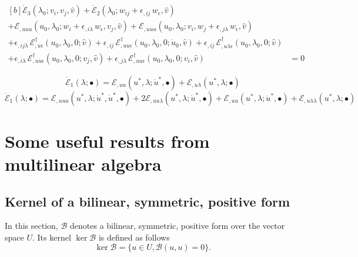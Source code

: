 \documentclass[12pt, final]{scrartcl}
\theoremstyle{definition}
\newcommand{\E}{\mathcal E}
\newcommand{\EE}{\mathcal E ^ \dagger}
\begin{document}
\begin{equation}
  \begin{aligned}[b]
    \dot{\E}_3(\lambda_0; v_i, v_j, \hat{v}) + \dot{\E}_2(\lambda_0; w_{ij} + \epsilon_{,ij} \, w_\epsilon, \hat{v}) &\\
    + \E_{,uuu}(u_0, \lambda_0; w_i + \epsilon_{,i\lambda} \,  w_\epsilon, v_j, \hat{v}) + \E_{,uuu}(u_0, \lambda_0; v_i, w_j + \epsilon_{,j\lambda} \,  w_\epsilon, \hat{v}) &\\
    + \epsilon_{,ij\lambda} \, \EE_{,u\epsilon}(u_0, \lambda_0, 0; \hat{v}) + \epsilon_{,ij} \, \EE_{,uu\epsilon}(u_0, \lambda_0, 0; \dot{u}_0, \hat{v}) + \epsilon_{,ij} \, \EE_{,u\lambda\epsilon}(u_0, \lambda_0, 0; \hat{v}) &\\
    + \epsilon_{,i\lambda} \, \EE_{,uu\epsilon}(u_0, \lambda_0, 0; v_j, \hat{v}) + \epsilon_{,j\lambda} \, \EE_{,uu\epsilon}(u_0, \lambda_0, 0; v_i, \hat{v}) &= 0
  \end{aligned}
\end{equation}


\begin{equation*}
  \dot{\E}_1(\lambda; \bullet) = \E_{,uu}(u^\ast, \lambda; \dot{u}^\ast, \bullet) + \E_{,u\lambda}(u^\ast, \lambda; \bullet)
\end{equation*}
\begin{equation*}
  \ddot{\E}_1(\lambda; \bullet) = \E_{,uuu}(u^\ast, \lambda; \dot{u}^\ast, \dot{u}^\ast, \bullet) + 2\E_{,uu\lambda}(u^\ast, \lambda; \dot{u}^\ast, \bullet) + \E_{,uu}(u^\ast, \lambda; \ddot{u}^\ast, \bullet) + \E_{,u\lambda\lambda}(u^\ast, \lambda; \bullet)
\end{equation*}

\appendix

\section{Some useful results from multilinear algebra}

\subsection{Kernel of a bilinear, symmetric, positive form}

In this section, $\mathcal{B}$ denotes a bilinear, symmetric, positive form over the vector space $U$. Its kernel
$\ker \mathcal{B}$ is defined as follows
\begin{equation}
 \ker \mathcal{B}= \bigl\{ u \in U, \mathcal{B}(u, u) = 0 \bigr\} .
\end{equation}
\end{document}
